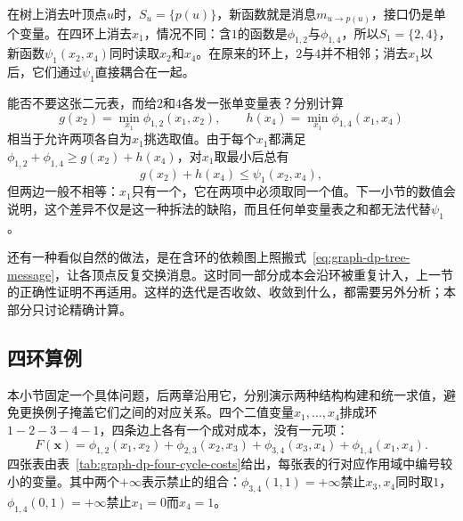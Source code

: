 在树上消去叶顶点$u$时，$S_u=\{p(u)\}$，新函数就是消息$m_{u\to p(u)}$，接口仍是单个变量。在四环上消去$x_1$，情况不同：含$1$的函数是$\phi_{1,2}$与$\phi_{1,4}$，所以$S_1=\{2,4\}$，新函数$\psi_1(x_2,x_4)$同时读取$x_2$和$x_4$。在原来的环上，$2$与$4$并不相邻；消去$x_1$以后，它们通过$\psi_1$直接耦合在一起。

能否不要这张二元表，而给$2$和$4$各发一张单变量表？分别计算
\[
g(x_2)=\min_{x_1}\phi_{1,2}(x_1,x_2),\qquad h(x_4)=\min_{x_1}\phi_{1,4}(x_1,x_4)
\]
相当于允许两项各自为$x_1$挑选取值。由于每个$x_1$都满足$\phi_{1,2}+\phi_{1,4}\geq g(x_2)+h(x_4)$，对$x_1$取最小后总有
\[
g(x_2)+h(x_4)\leq\psi_1(x_2,x_4),
\]
但两边一般不相等：$x_1$只有一个，它在两项中必须取同一个值。下一小节的数值会说明，这个差异不仅是这一种拆法的缺陷，而且任何单变量表之和都无法代替$\psi_1$。

还有一种看似自然的做法，是在含环的依赖图上照搬式~\eqref{eq:graph-dp-tree-message}，让各顶点反复交换消息。这时同一部分成本会沿环被重复计入，上一节的正确性证明不再适用。这样的迭代是否收敛、收敛到什么，都需要另外分析；本部分只讨论精确计算。

\subsection{四环算例}
\label{sec:graph-dp-four-cycle}

本小节固定一个具体问题，后两章沿用它，分别演示两种结构构建和统一求值，避免更换例子掩盖它们之间的对应关系。四个二值变量$x_1,\ldots,x_4$排成环$1-2-3-4-1$，四条边上各有一个成对成本，没有一元项：
\begin{equation}
F(\bm x)=\phi_{1,2}(x_1,x_2)+\phi_{2,3}(x_2,x_3)+\phi_{3,4}(x_3,x_4)+\phi_{1,4}(x_1,x_4).
\label{eq:graph-dp-four-cycle}
\end{equation}
四张表由表~\ref{tab:graph-dp-four-cycle-costs}给出，每张表的行对应作用域中编号较小的变量。其中两个$+\infty$表示禁止的组合：$\phi_{3,4}(1,1)=+\infty$禁止$x_3,x_4$同时取$1$，$\phi_{1,4}(0,1)=+\infty$禁止$x_1=0$而$x_4=1$。

